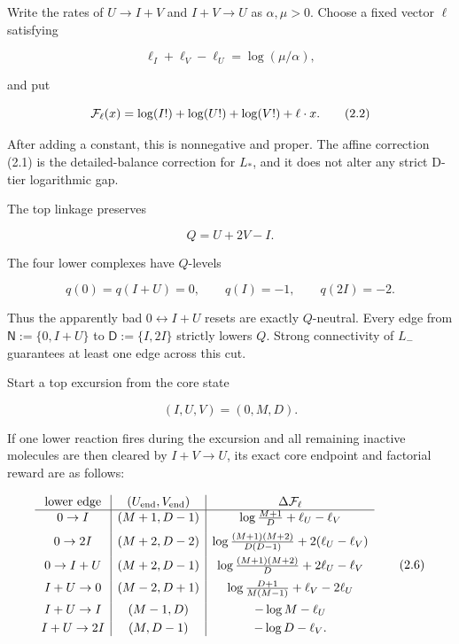 Write the rates of \(U\to I+V\) and \(I+V\to U\) as \(\alpha,\mu>0\).
Choose a fixed vector \(\ell\) satisfying

\[
 \ell_I+\ell_V-\ell_U=\log(\mu/\alpha),                 \tag{2.1}
\]

and put

\[
 {\cal F}_\ell(x)=\log(I!)+\log(U!)+\log(V!)+\ell\cdot x.
\tag{2.2}
\]

After adding a constant, this is nonnegative and proper. The affine
correction (2.1) is the detailed-balance correction for \(L_*\), and it
does not alter any strict D-tier logarithmic gap.

The top linkage preserves

\[
 Q=U+2V-I.                                             \tag{2.3}
\]

The four lower complexes have \(Q\)-levels

\[
 q(0)=q(I+U)=0,\qquad q(I)=-1,\qquad q(2I)=-2.         \tag{2.4}
\]

Thus the apparently bad \(0\leftrightarrow I+U\) resets are exactly
\(Q\)-neutral. Every edge from \({\mathsf N}:=\{0,I+U\}\) to
\({\mathsf D}:=\{I,2I\}\) strictly lowers \(Q\). Strong connectivity of
\(L_-\) guarantees at least one edge across this cut.

Start a top excursion from the core state

\[
 (I,U,V)=(0,M,D).                                      \tag{2.5}
\]

If one lower reaction fires during the excursion and all remaining
inactive molecules are then cleared by \(I+V\to U\), its exact core
endpoint and factorial reward are as follows:

\[
\begin{array}{c|c|c}
\text{lower edge}&(U_{\rm end},V_{\rm end})
 &\Delta{\cal F}_\ell\\ \hline
0\to I&(M+1,D-1)&
 \log\frac{M+1}{D}+\ell_U-\ell_V\\[2mm]
0\to2I&(M+2,D-2)&
 \log\frac{(M+1)(M+2)}{D(D-1)}
       +2(\ell_U-\ell_V)\\[2mm]
0\to I+U&(M+2,D-1)&
 \log\frac{(M+1)(M+2)}D+2\ell_U-\ell_V\\[2mm]
I+U\to0&(M-2,D+1)&
 \log\frac{D+1}{M(M-1)}+\ell_V-2\ell_U\\[2mm]
I+U\to I&(M-1,D)&-\log M-\ell_U\\[1mm]
I+U\to2I&(M,D-1)&-\log D-\ell_V .
\end{array}                                            \tag{2.6}
\]

